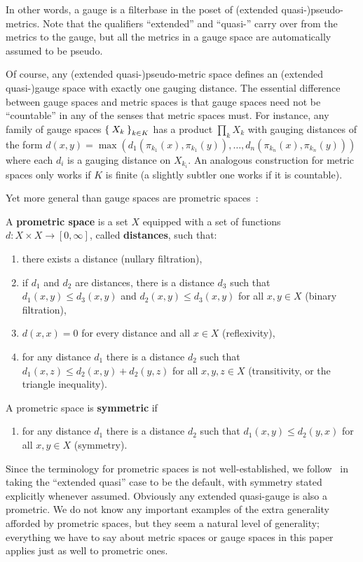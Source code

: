 \documentclass{article}
\def\Rp{[0,\infty]}
\begin{document}
In other words, a gauge is a filterbase in the poset of (extended quasi-)pseudo-metrics.
Note that the qualifiers ``extended'' and ``quasi-'' carry over from the metrics to the gauge, but all the metrics in a gauge space are automatically assumed to be pseudo.

Of course, any (extended quasi-)pseudo-metric space defines an (extended quasi-)gauge space with exactly one gauging distance.
The essential difference between gauge spaces and metric spaces is that gauge spaces need not be ``countable'' in any of the senses that metric spaces must.
For instance, any family of gauge spaces $\Set{X_k}_{k\in K}$ has a product $\prod_k X_k$ with gauging distances of the form $d(x,y) = \max(d_1(\pi_{k_1}(x),\pi_{k_1}(y)),\dots,d_n(\pi_{k_n}(x),\pi_{k_n}(y)))$ where each $d_i$ is a gauging distance on $X_{k_i}$.
An analogous construction for metric spaces only works if $K$ is finite (a slightly subtler one works if it is countable).

Yet more general than gauge spaces are prometric spaces~\cite{cht:one-setting}:

\begin{defn}
  A \textbf{prometric space} is a set $X$ equipped with a set of functions $d:X\times X\to\Rp$, called \textbf{distances}, such that:
  \begin{enumerate}
  \item there exists a distance (nullary filtration),
  \item if $d_1$ and $d_2$ are distances, there is a distance $d_3$ such that $d_1(x,y)\le d_3(x,y)$ and $d_2(x,y)\le d_3(x,y)$ for all $x,y\in X$ (binary filtration),
  \item $d(x,x)=0$ for every distance and all $x\in X$ (reflexivity),
  \item for any distance $d_1$ there is a distance $d_2$ such that $d_1(x,z)\le d_2(x,y)+d_2(y,z)$ for all $x,y,z\in X$ (transitivity, or the triangle inequality).
  \end{enumerate}
  A prometric space is \textbf{symmetric} if
  \begin{enumerate}[resume]
  \item for any distance $d_1$ there is a distance $d_2$ such that $d_1(x,y)\le d_2(y,x)$ for all $x,y\in X$ (symmetry).
  \end{enumerate}
\end{defn}

Since the terminology for prometric spaces is not well-established, we follow~\cite{cht:one-setting} in taking the ``extended quasi'' case to be the default, with symmetry stated explicitly whenever assumed.
Obviously any extended quasi-gauge is also a prometric.
We do not know any important examples of the extra generality afforded by prometric spaces, but they seem a natural level of generality; everything we have to say about metric spaces or gauge spaces in this paper applies just as well to prometric ones.
\end{document}
